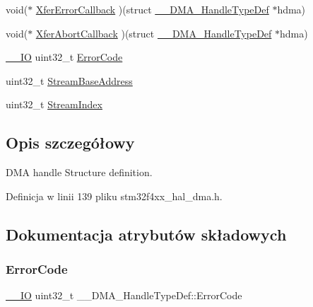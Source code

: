 \begin{DoxyCompactItemize}
void($\ast$ \hyperlink{struct_____d_m_a___handle_type_def_a5905bba1de7dc9d803a50dfb44d0a9e8}{Xfer\+Error\+Callback} )(struct \hyperlink{struct_____d_m_a___handle_type_def}{\+\_\+\+\_\+\+D\+M\+A\+\_\+\+Handle\+Type\+Def} $\ast$hdma)
\item 
void($\ast$ \hyperlink{struct_____d_m_a___handle_type_def_a5866f59e3a12760e559c4547ebf19d37}{Xfer\+Abort\+Callback} )(struct \hyperlink{struct_____d_m_a___handle_type_def}{\+\_\+\+\_\+\+D\+M\+A\+\_\+\+Handle\+Type\+Def} $\ast$hdma)
\item 
\hyperlink{core__sc300_8h_aec43007d9998a0a0e01faede4133d6be}{\+\_\+\+\_\+\+IO} uint32\+\_\+t \hyperlink{struct_____d_m_a___handle_type_def_a67a2a8b907bc9b5c0af87f9de2bffc29}{Error\+Code}
\item 
uint32\+\_\+t \hyperlink{struct_____d_m_a___handle_type_def_ab9250d33bdf9de7b87fa4325382518c4}{Stream\+Base\+Address}
\item 
uint32\+\_\+t \hyperlink{struct_____d_m_a___handle_type_def_a3ada2bc091757d7b92ab8ca70211ccae}{Stream\+Index}
\end{DoxyCompactItemize}


\subsection{Opis szczegółowy}
D\+MA handle Structure definition. 

Definicja w linii 139 pliku stm32f4xx\+\_\+hal\+\_\+dma.\+h.



\subsection{Dokumentacja atrybutów składowych}
\mbox{\label{struct_____d_m_a___handle_type_def_a67a2a8b907bc9b5c0af87f9de2bffc29}} 
\subsubsection{\texorpdfstring{Error\+Code}{ErrorCode}}
{\footnotesize\ttfamily \hyperlink{core__sc300_8h_aec43007d9998a0a0e01faede4133d6be}{\+\_\+\+\_\+\+IO} uint32\+\_\+t \+\_\+\+\_\+\+D\+M\+A\+\_\+\+Handle\+Type\+Def\+::\+Error\+Code}

